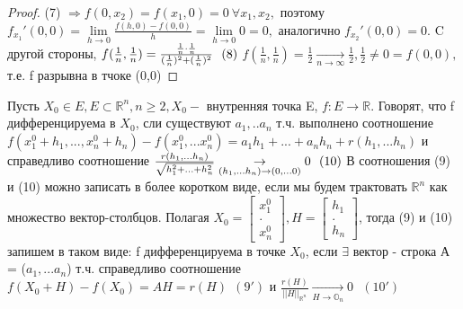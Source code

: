 \begin{proof}
	(7) $\Rightarrow f(0,x_2) = f(x_1,0) = 0  \ \forall x_1,x_2,$ поэтому $f_{x_1}'(0,0) = \lim\limits_{h \to 0}{\frac{f(h,0)-f(0,0)}{h}} = \lim\limits_{h \to 0}0 = 0,$ аналогично $f_{x_2}'(0,0)  = 0$. C другой стороны, $f(\frac{1}{n},\frac{1}{n})=\frac{\frac{1}{n}\cdot \frac{1}{n}}{(\frac{1}{n})^2+(\frac{1}{n})^2} \ \ (8) \\$
	$f(\frac{1}{n},\frac{1}{n}) = \frac{1}{2} \underset{n \to \infty}{\to} \frac{1}{2}, \frac{1}{2} \neq 0 = f(0,0), $т.е. f разрывна в тчоке (0,0)
\end{proof}
\begin{definition}
	Пусть $X_0 \in E, E \subset \mathbb{R}^n, n\geq 2, X_0 - $ внутренняя точка E, $f : E \to \mathbb{R}$. Говорят, что f дифференцируема в $X_0$, сли существуют $a_1,..a_n$ т.ч. выполнено соотношение $f(x_1^0+ h_1,...,x_n^0+h_n)-f(x_1^0,...x_n^0) = a_1h_1+...+a_nh_n +r(h_1,...h_n)$ и справедливо соотношение $\frac{r(h_1,...h_n)}{\sqrt{h_1^2+...+h_n^2}} \underset{(h_1,...h_n) \to (0,...0)}{\to} 0 \ \ (10) \\$
	В соотношения (9) и (10) можно записать в более коротком виде, если мы будем трактовать $\mathbb{R}^n$ как множество вектор-столбцов. Полагая
	 $X_0 = 
	 \begin{bmatrix}
	  x_1^0 \\ . \\ x_n^0
	   \end{bmatrix},
	H = \begin{bmatrix} h_1 \\ . \\ h_n \end{bmatrix}$, тогда (9) и (10) запишем в таком виде: f дифференцируема в точке $X_0$, если $\exists$ вектор - строка А = ($a_1,...a_n$) т.ч. справедливо соотношение $f(X_0 + H) - f(X_0) = AH = r(H) \ \ (9')$ и $\frac{r(H)}{||H||_{\mathbb{R}^n}} \underset{H \to \mathbb{O}_n}{\to} 0 \ \ \ (10')$
\end{definition}
